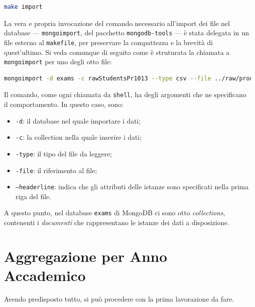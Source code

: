 		\begin{lstlisting}[language=bash,caption={importazione dei dati in MongoDB}]
			make import
		\end{lstlisting}

		\vspace{0.3cm}

		La vera e propria invocazione del comando necessario all'import dei file nel database --- \texttt{mongoimport}, del pacchetto \texttt{mongodb-tools} --- è stata delegata in un file esterno al \texttt{makefile}, per preservare la compattezza e la brevità di quest'ultimo. Si veda comunque di seguito come è struturata la chiamata a \texttt{mongoimport} per uno degli otto file: 

		\begin{lstlisting}[language=bash,caption={dettaglio dell'importazione dei dati in MongoDB}]
			mongoimport -d exams -c rawStudentsPr1013 --type csv --file ../raw/prod_stud_10-11-12-13.csv --headerline
		\end{lstlisting}

		\vspace{0.3cm}

		Il comando, come ogni chiamata da \texttt{shell}, ha degli argomenti che ne specificano il comportamento. In questo caso, sono:

		\begin{itemize}
			\item \texttt{-d}: il database nel quale importare i dati;
			\item \texttt{-c}: la collection nella quale inserire i dati;
			\item \texttt{-type}: il tipo del file da leggere;
			\item \texttt{-file}: il riferimento al file;
			\item \texttt{--headerline}: indica che gli attributi delle istanze sono specificati nella prima riga del file.
		\end{itemize}

		A questo punto, nel database \texttt{exams} di MongoDB ci sono otto \textit{collections}, contenenti i \textit{documenti} che rappresentano le istanze dei dati a disposizione.

\section{Aggregazione per Anno Accademico}

	Avendo predisposto tutto, si può procedere con la prima lavorazione da fare. \\
	
